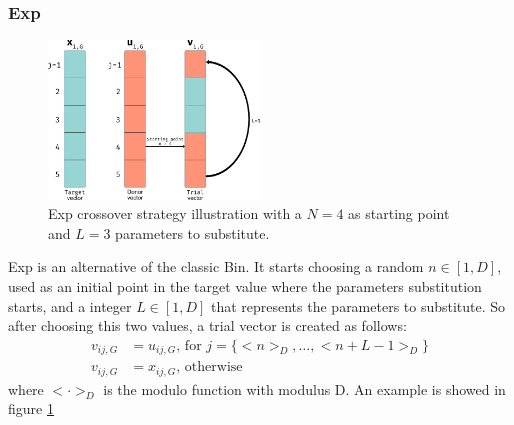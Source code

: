 \subsubsection{Exp}
\begin{figure}[h!]
	\centering
	\includegraphics[width=0.5\textwidth]{figures/de-exp.png}
	\caption{Exp crossover strategy illustration with a $N = 4$ as starting point and $L = 3$ parameters to substitute.}
	\label{fig:exp-crossover}
\end{figure}
Exp is an alternative of the classic Bin. It starts choosing a random $n \in [1, D]$, used as an initial point in the target value where the parameters substitution starts, and a integer $L \in [1, D]$ that represents the parameters to substitute. So after choosing this two values, a trial vector is created as follows:
\begin{align}
	v_{ij, G} &= u_{ij, G}\textrm{,  for } j = \{<n>_{D}, \dots, <n + L - 1>_{D}\} \\
	v_{ij, G} &= x_{ij, G}\textrm{,  otherwise}
\end{align} 
where $< \cdot >_{D}$ is the modulo function with modulus D. An example is showed in figure \ref{fig:exp-crossover}
